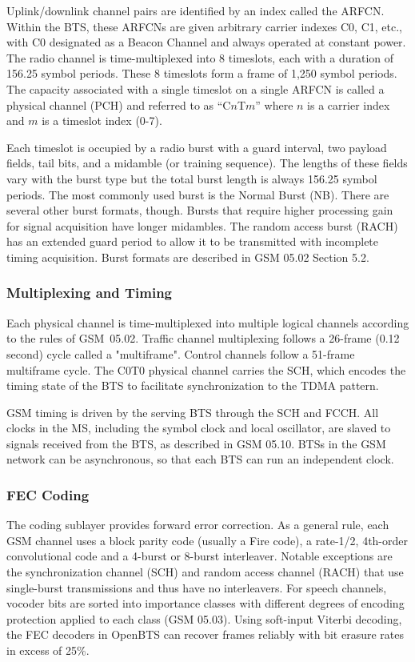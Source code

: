 \documentclass[11pt,openany]{book}
\begin{document}
Uplink/downlink channel pairs are identified by an index called the ARFCN. Within the BTS, these ARFCNs are given arbitrary carrier indexes C0, C1, etc., with C0 designated as a Beacon Channel and always operated at constant power.
The radio channel is time-multiplexed into 8 timeslots, each with a duration of 156.25 symbol periods. These 8 timeslots form a frame of 1,250 symbol periods. The capacity associated with a single timeslot on a single ARFCN is called a physical channel (PCH) and referred to as ``C$n$T$m$'' where $n$ is a carrier index and $m$ is a timeslot index (0-7).

Each timeslot is occupied by a radio burst with a guard interval, two payload fields, tail bits, and a midamble (or training sequence). The lengths of these fields vary with the burst type but the total burst length is always 156.25 symbol periods. The most commonly used burst is the Normal Burst (NB).
There are several other burst formats, though. Bursts that require higher processing gain for signal acquisition have longer midambles. The random access burst (RACH) has an extended guard period to allow it to be transmitted with incomplete timing acquisition. Burst formats are described in GSM 05.02 Section 5.2.

\subsubsection{Multiplexing and Timing}
Each physical channel is time-multiplexed into multiple logical channels according to the rules of GSM~05.02. Traffic channel multiplexing follows a 26-frame (0.12 second) cycle called a "multiframe". Control channels follow a 51-frame multiframe cycle.  The C0T0 physical channel carries the SCH, which encodes the timing state of the BTS to facilitate synchronization to the TDMA pattern.

GSM timing is driven by the serving BTS through the SCH and FCCH. All clocks in the MS, including the symbol clock and local oscillator, are slaved to signals received from the BTS, as described in GSM 05.10. BTSs in the GSM network can be asynchronous, so that each BTS can run an independent clock.

\subsubsection{FEC Coding}
The coding sublayer provides forward error correction. As a general rule, each GSM channel uses a block parity code (usually a Fire code), a rate-1/2, 4th-order convolutional code and a 4-burst or 8-burst interleaver. Notable exceptions are the synchronization channel (SCH) and random access channel (RACH) that use single-burst transmissions and thus have no interleavers. For speech channels, vocoder bits are sorted into importance classes with different degrees of encoding protection applied to each class (GSM 05.03).
Using soft-input Viterbi decoding, the FEC decoders in OpenBTS can recover frames reliably with bit erasure rates in excess of 25\%.
\end{document}
